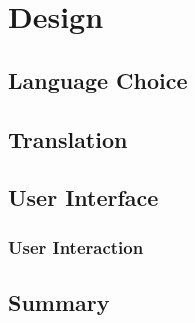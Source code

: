 \documentclass[12pt]{ociamthesis}  %
\begin{document}


\chapter{Design}

\section{Language Choice}
\section{Translation}
\section{User Interface}
	\subsection{User Interaction}
\section{Summary}

\end{document}
